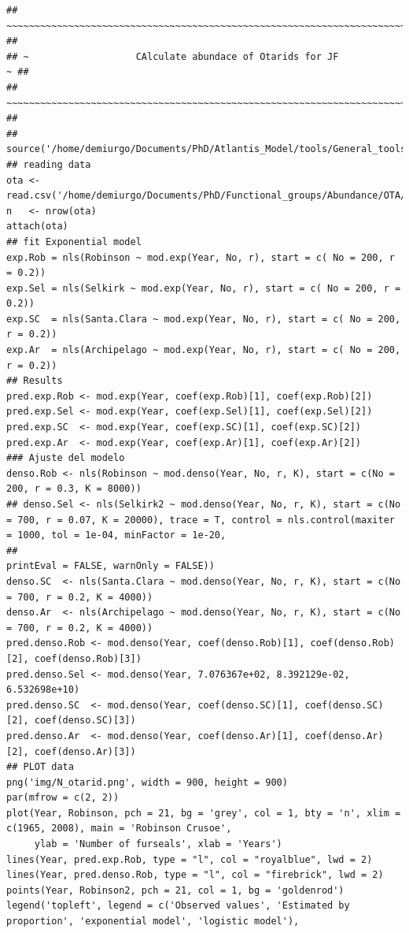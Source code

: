 \documentclass[11pt]{article}
\begin{document}
\begin{itemize}
\begin{itemize}
\begin{verbatim}
## ~~~~~~~~~~~~~~~~~~~~~~~~~~~~~~~~~~~~~~~~~~~~~~~~~~~~~~~~~~~~~~~~~~~~~~~~ ##
## ~                   CAlculate abundace of Otarids for JF                 ~ ##
## ~~~~~~~~~~~~~~~~~~~~~~~~~~~~~~~~~~~~~~~~~~~~~~~~~~~~~~~~~~~~~~~~~~~~~~~~ ##
##
source('/home/demiurgo/Documents/PhD/Atlantis_Model/tools/General_tools/Atlantis_tools.R')
## reading data
ota <- read.csv('/home/demiurgo/Documents/PhD/Functional_groups/Abundance/OTA/Ota.csv')
n   <- nrow(ota)
attach(ota)
## fit Exponential model
exp.Rob = nls(Robinson ~ mod.exp(Year, No, r), start = c( No = 200, r = 0.2))
exp.Sel = nls(Selkirk ~ mod.exp(Year, No, r), start = c( No = 200, r = 0.2))
exp.SC  = nls(Santa.Clara ~ mod.exp(Year, No, r), start = c( No = 200, r = 0.2))
exp.Ar  = nls(Archipelago ~ mod.exp(Year, No, r), start = c( No = 200, r = 0.2))
## Results
pred.exp.Rob <- mod.exp(Year, coef(exp.Rob)[1], coef(exp.Rob)[2])
pred.exp.Sel <- mod.exp(Year, coef(exp.Sel)[1], coef(exp.Sel)[2])
pred.exp.SC  <- mod.exp(Year, coef(exp.SC)[1], coef(exp.SC)[2])
pred.exp.Ar  <- mod.exp(Year, coef(exp.Ar)[1], coef(exp.Ar)[2])
### Ajuste del modelo
denso.Rob <- nls(Robinson ~ mod.denso(Year, No, r, K), start = c(No = 200, r = 0.3, K = 8000))
## denso.Sel <- nls(Selkirk2 ~ mod.denso(Year, No, r, K), start = c(No = 700, r = 0.07, K = 20000), trace = T, control = nls.control(maxiter = 1000, tol = 1e-04, minFactor = 1e-20,
##                                                                                                                                  printEval = FALSE, warnOnly = FALSE))
denso.SC  <- nls(Santa.Clara ~ mod.denso(Year, No, r, K), start = c(No = 700, r = 0.2, K = 4000))
denso.Ar  <- nls(Archipelago ~ mod.denso(Year, No, r, K), start = c(No = 700, r = 0.2, K = 4000))
pred.denso.Rob <- mod.denso(Year, coef(denso.Rob)[1], coef(denso.Rob)[2], coef(denso.Rob)[3])
pred.denso.Sel <- mod.denso(Year, 7.076367e+02, 8.392129e-02, 6.532698e+10)
pred.denso.SC  <- mod.denso(Year, coef(denso.SC)[1], coef(denso.SC)[2], coef(denso.SC)[3])
pred.denso.Ar  <- mod.denso(Year, coef(denso.Ar)[1], coef(denso.Ar)[2], coef(denso.Ar)[3])
## PLOT data
png('img/N_otarid.png', width = 900, height = 900)
par(mfrow = c(2, 2))
plot(Year, Robinson, pch = 21, bg = 'grey', col = 1, bty = 'n', xlim = c(1965, 2008), main = 'Robinson Crusoe',
     ylab = 'Number of furseals', xlab = 'Years')
lines(Year, pred.exp.Rob, type = "l", col = "royalblue", lwd = 2)
lines(Year, pred.denso.Rob, type = "l", col = "firebrick", lwd = 2)
points(Year, Robinson2, pch = 21, col = 1, bg = 'goldenrod')
legend('topleft', legend = c('Observed values', 'Estimated by proportion', 'exponential model', 'logistic model'),

\end{verbatim}
\end{itemize}
\end{itemize}
\end{document}

